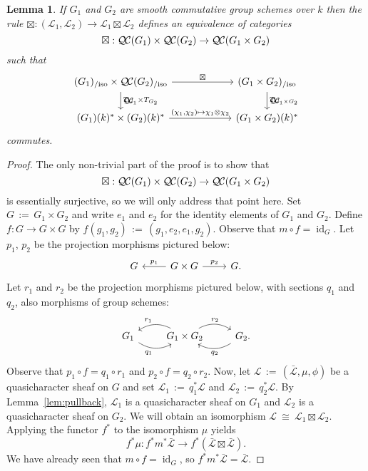 \documentclass[10pt]{amsart}
\theoremstyle{plain}
\newtheorem{lemma}[theorem]{Lemma}
\theoremstyle{definition}
\theoremstyle{remark}
\newcommand{\Fq}{k}
\DeclareMathOperator{\id}{id}
\newcommand{\ceq}{{\, :=\, }}
\newcommand{\iso}{{\ \cong\ }}
\newcommand{\TrFrob}[1]{T_{#1}}
\newcommand{\qcs}[1]{{\mathcal{#1}}}
\newcommand{\gqcs}[1]{{\mathcal{\bar #1}}}
\newcommand{\QC}{{\mathcal{Q\hskip-0.8pt C}}}
\newcommand{\QCiso}[1]{\QC(#1)_{/\text{iso}}}
\begin{document}
\begin{lemma}\label{lem:product}
If $G_1$ and $G_2$ are smooth commutative group schemes over $\Fq$ then the rule
$\boxtimes : (\qcs{L}_1,\qcs{L}_2)\to \qcs{L}_1\boxtimes\qcs{L}_2$ defines an equivalence of categories
\[
\boxtimes : \QC(G_1)\times \QC(G_2) \to \QC(G_1\times G_2)
\]
such that
\[
\begin{tikzcd}[column sep=60]
\arrow{d}{\TrFrob{G_1} \times \TrFrob{G_2}} \QCiso{G_1}\times \QCiso{G_2} \arrow{r}{\boxtimes}
& \arrow{d}{\TrFrob{G_1\times G_2}} \QCiso{G_1\times G_2}\\
(G_1)(\Fq)^*\times (G_2)(\Fq)^* \arrow{r}{(\chi_1,\chi_2)\mapsto \chi_1\otimes \chi_2}  & (G_1\times G_2)(\Fq)^*
\end{tikzcd}
\]
commutes.
\end{lemma}
\begin{proof}
The only non-trivial part of the proof is to show that 
\[\boxtimes
 : \QC(G_1)\times \QC(G_2) \to \QC(G_1\times G_2)
 \]
is essentially surjective, so we will only address that point here.
%
Set $G \ceq G_1\times G_2$
and write $e_1$ and $e_2$ for the identity elements of $G_1$ and $G_2$.
Define $f : G\to G\times G$ by $f(g_1,g_2) \ceq (g_1,e_2,e_1,g_2)$.
Observe that $m\circ f = \id_G$.
Let $p_1$, $p_2$ be the projection morphisms pictured below:
\[
\begin{tikzcd}
G & \arrow[swap]{l}{p_1} G\times G \arrow{r}{p_2} & G.
\end{tikzcd}
\]
Let $r_1$ and $r_2$ be the projection morphisms pictured below,
with sections $q_1$ and $q_2$, also morphisms of group schemes:
\[
\begin{tikzcd}
G_1  \arrow[swap, bend right]{r}{q_1} &
\arrow[swap, bend right]{l}{r_1} G_1\times G_2 \arrow[bend left]{r}{r_2} &
\arrow[bend left]{l}{q_2} G_2.
\end{tikzcd}
\]
Observe that $p_1\circ f = q_1 \circ r_1$ and $p_2 \circ f = q_2\circ r_2$.
%
Now, let $\qcs{L} \ceq (\gqcs{L},\mu,\phi)$ be a quasicharacter sheaf on $G$
and set $\qcs{L}_1 \ceq q_1^* \qcs{L}$ and $\qcs{L}_2 \ceq q_2^* \qcs{L}$.
By Lemma~\ref{lem:pullback}, $\qcs{L}_1$ is a quasicharacter sheaf on $G_1$
and $\qcs{L}_2$ is a quasicharacter sheaf on $G_2$.
We will obtain an isomorphism $\qcs{L} \iso  \qcs{L}_1\boxtimes \qcs{L}_2$.
Applying the functor $f^*$ to the isomorphism $\mu$ yields
\begin{equation}\label{eq:fm}
f^*\mu : f^* m^* \gqcs{L} \to f^*(\gqcs{L}\boxtimes \gqcs{L}) .
\end{equation}
We have already seen that $m\circ f = \id_G$, so $f^* m^* \gqcs{L} = \gqcs{L}$.  

\end{proof}
\end{document}
